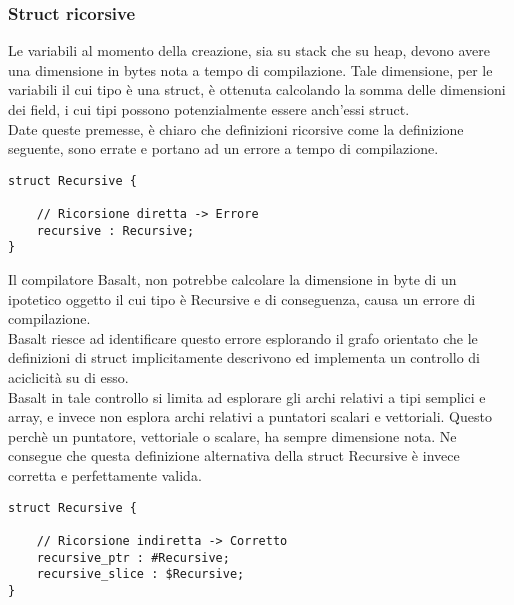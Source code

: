 \subsubsection{Struct ricorsive}
Le variabili al momento della creazione, sia su stack che su heap, devono avere una dimensione 
in bytes nota a tempo di compilazione. Tale dimensione, per le variabili il cui tipo è una struct, 
è ottenuta calcolando la somma delle dimensioni dei field, i cui tipi possono potenzialmente 
essere anch’essi struct. \\ 

Date queste premesse, è chiaro che definizioni ricorsive come la definizione seguente, 
sono errate e portano ad un errore a tempo di compilazione. \\

\vspace{0.5cm}
\begin{lstlisting}[frame=single]
struct Recursive {

    // Ricorsione diretta -> Errore
    recursive : Recursive;
}
\end{lstlisting}
\vspace{0.5cm}

 
Il compilatore Basalt, non potrebbe calcolare la dimensione in byte di un ipotetico oggetto il cui tipo è 
Recursive e di conseguenza, causa un errore di compilazione. \\ 

Basalt riesce ad identificare questo errore esplorando il grafo orientato che le definizioni di struct implicitamente 
descrivono ed implementa un controllo di aciclicità su di esso. \\

Basalt in tale controllo si limita ad esplorare gli archi relativi a tipi semplici e array, 
e invece non esplora archi relativi a puntatori scalari e vettoriali. Questo perchè un puntatore, 
vettoriale o scalare, ha sempre dimensione nota. Ne consegue che questa definizione alternativa 
della struct Recursive è invece corretta e perfettamente valida. \\

\vspace{0.5cm}
\begin{lstlisting}[frame=single]
struct Recursive {

    // Ricorsione indiretta -> Corretto
    recursive_ptr : #Recursive;
    recursive_slice : $Recursive;
}
\end{lstlisting}
\vspace{0.5cm}